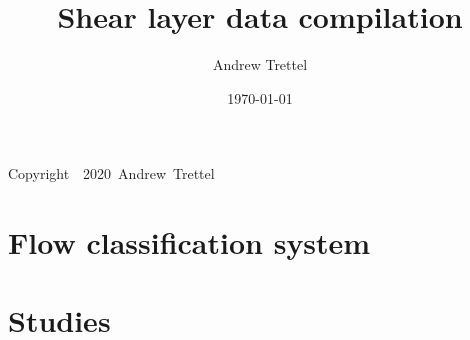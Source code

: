 \documentclass[12pt,oneside]{book}
\title{Shear layer data compilation}
\date{\today}
\author{Andrew Trettel}
\begin{document}
\frontmatter
\maketitle

\clearpage\null\vfill
\pagestyle{empty}
\begin{center}
Copyright~\textcopyright~2020~Andrew~Trettel
\end{center}

\tableofcontents

\mainmatter

\chapter{Flow classification system}



\chapter{Studies}
\end{document}
